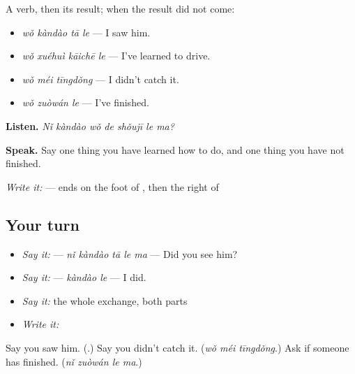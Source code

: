 \begin{grammarlens}[title={What you've built — five verbs that finish}]
A verb, then its result;  when the result did not come:

\begin{itemize}
\raggedright
  \item \textbf{} \emph{wǒ kàndào tā le} — I saw him.
  \item \textbf{} \emph{wǒ xuéhuì kāichē le} — I've learned to drive.
  \item \emph{wǒ méi tīngdǒng} — I didn't catch it.
  \item \emph{wǒ zuòwán le} — I've finished.
\end{itemize}

\textbf{Listen.} \emph{Nǐ kàndào wǒ de shǒujī le ma?}

\textbf{Speak.} Say one thing you have learned how to do, and one thing you have not finished.

\emph{Write it:}  —  ends on the foot of , then the right of 
\end{grammarlens}

\subsection*{Your turn}
\begin{itemize}
\raggedright
  \item \emph{Say it:}  — \emph{nǐ kàndào tā le ma} — Did you see him?
  \item \emph{Say it:}  — \emph{kàndào le} — I did.
  \item \emph{Say it:} the whole exchange, both parts
  \item \emph{Write it:} 
\end{itemize}

\begin{tcolorbox}[breakable,colback=teal!4,colframe=teal!35!black,title={Before you move on}]
Say you saw him. (\textbf{}.) Say you didn't catch it. (\emph{wǒ méi tīngdǒng}.) Ask if someone has finished. (\emph{nǐ zuòwán le ma}.)
\end{tcolorbox}
